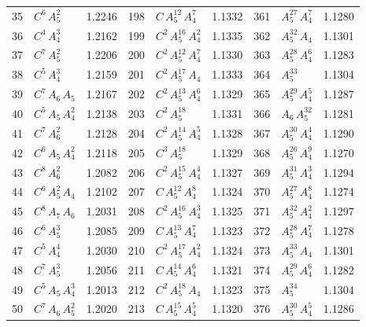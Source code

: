 \begin{longtable}{@{}rlr@{\quad}rlr@{\quad}rlr@{}}
35 & $C^{6}$\,$A_{5}^{2}$ & 1.2246 & 198 & $C$\,$A_{5}^{12}$\,$A_{4}^{7}$ & 1.1332 & 361 & $A_{5}^{27}$\,$A_{4}^{7}$ & 1.1280 \\
36 & $C^{4}$\,$A_{4}^{3}$ & 1.2162 & 199 & $C^{2}$\,$A_{5}^{16}$\,$A_{4}^{2}$ & 1.1335 & 362 & $A_{5}^{32}$\,$A_{4}$ & 1.1301 \\
37 & $C^{7}$\,$A_{5}^{2}$ & 1.2206 & 200 & $C^{2}$\,$A_{5}^{12}$\,$A_{4}^{7}$ & 1.1330 & 363 & $A_{5}^{28}$\,$A_{4}^{6}$ & 1.1283 \\
38 & $C^{5}$\,$A_{4}^{3}$ & 1.2159 & 201 & $C^{2}$\,$A_{5}^{17}$\,$A_{4}$ & 1.1333 & 364 & $A_{5}^{33}$ & 1.1304 \\
39 & $C^{7}$\,$A_{6}$\,$A_{5}$ & 1.2167 & 202 & $C^{2}$\,$A_{5}^{13}$\,$A_{4}^{6}$ & 1.1329 & 365 & $A_{5}^{29}$\,$A_{4}^{5}$ & 1.1287 \\
40 & $C^{5}$\,$A_{5}$\,$A_{4}^{2}$ & 1.2138 & 203 & $C^{2}$\,$A_{5}^{18}$ & 1.1331 & 366 & $A_{6}$\,$A_{5}^{32}$ & 1.1281 \\
41 & $C^{7}$\,$A_{6}^{2}$ & 1.2128 & 204 & $C^{2}$\,$A_{5}^{14}$\,$A_{4}^{5}$ & 1.1328 & 367 & $A_{5}^{30}$\,$A_{4}^{4}$ & 1.1290 \\
42 & $C^{6}$\,$A_{5}$\,$A_{4}^{2}$ & 1.2118 & 205 & $C^{3}$\,$A_{5}^{18}$ & 1.1329 & 368 & $A_{5}^{26}$\,$A_{4}^{9}$ & 1.1270 \\
43 & $C^{8}$\,$A_{6}^{2}$ & 1.2082 & 206 & $C^{2}$\,$A_{5}^{15}$\,$A_{4}^{4}$ & 1.1327 & 369 & $A_{5}^{31}$\,$A_{4}^{3}$ & 1.1294 \\
44 & $C^{6}$\,$A_{5}^{2}$\,$A_{4}$ & 1.2102 & 207 & $C$\,$A_{5}^{12}$\,$A_{4}^{8}$ & 1.1324 & 370 & $A_{5}^{27}$\,$A_{4}^{8}$ & 1.1274 \\
45 & $C^{8}$\,$A_{7}$\,$A_{6}$ & 1.2031 & 208 & $C^{2}$\,$A_{5}^{16}$\,$A_{4}^{3}$ & 1.1325 & 371 & $A_{5}^{32}$\,$A_{4}^{2}$ & 1.1297 \\
46 & $C^{6}$\,$A_{5}^{3}$ & 1.2085 & 209 & $C$\,$A_{5}^{13}$\,$A_{4}^{7}$ & 1.1323 & 372 & $A_{5}^{28}$\,$A_{4}^{7}$ & 1.1278 \\
47 & $C^{5}$\,$A_{4}^{4}$ & 1.2030 & 210 & $C^{2}$\,$A_{5}^{17}$\,$A_{4}^{2}$ & 1.1324 & 373 & $A_{5}^{33}$\,$A_{4}$ & 1.1301 \\
48 & $C^{7}$\,$A_{5}^{3}$ & 1.2056 & 211 & $C$\,$A_{5}^{14}$\,$A_{4}^{6}$ & 1.1321 & 374 & $A_{5}^{29}$\,$A_{4}^{6}$ & 1.1282 \\
49 & $C^{5}$\,$A_{5}$\,$A_{4}^{3}$ & 1.2013 & 212 & $C^{2}$\,$A_{5}^{18}$\,$A_{4}$ & 1.1323 & 375 & $A_{5}^{34}$ & 1.1304 \\
50 & $C^{7}$\,$A_{6}$\,$A_{5}^{2}$ & 1.2020 & 213 & $C$\,$A_{5}^{15}$\,$A_{4}^{5}$ & 1.1320 & 376 & $A_{5}^{30}$\,$A_{4}^{5}$ & 1.1286 \\

\end{longtable}

